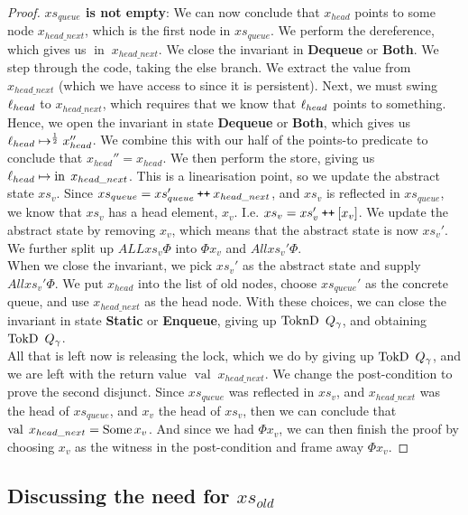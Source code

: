 \documentclass[a4paper, 11pt]{report}
\newcommand{\nIn}[1]{\operatorname{in} \; #1}
\newcommand{\nVal}[1]{\operatorname{val} \; #1}
\newcommand{\StaticState}{\textbf{Static}}
\newcommand{\EnqueueState}{\textbf{Enqueue}}
\newcommand{\DequeueState}{\textbf{Dequeue}}
\newcommand{\BothState}{\textbf{Both}}
\newcommand{\Qg}{Q_\gname}
\newcommand{\TokD}[1]{\operatorname{TokD}\ #1}
\newcommand{\TokDQg}{\TokD{\Qg}}
\newcommand{\ToknD}[1]{\operatorname{ToknD}\ #1}
\newcommand{\ToknDQg}{\ToknD{\Qg}}
\newcommand\catenate{\mathbin{\text{\ttfamily\upshape ++}}}
\begin{document}
\begin{proof}
\textbf{$xs_{queue}$ is not empty}:
We can now conclude that $x_{head}$ points to some node $x_{head\_next}$, which is the first node in $xs_{queue}$. We perform the dereference, which gives us $\nIn{x_{head\_next}}$. We close the invariant in \DequeueState{} or \BothState{}. We step through the code, taking the else branch. We extract the value from $x_{head\_next}$ (which we have access to since it is persistent). Next, we must swing $\ell_{head}$ to $x_{head\_next}$, which requires that we know that $\ell_{head}$ points to something. Hence, we open the invariant in state \DequeueState{} or \BothState{}, which gives us $\ell_{head} \mapsto^{\frac{1}{2}} x_{head}''$. We combine this with our half of the points-to predicate to conclude that $x_{head}'' = x_{head}$. We then perform the store, giving us $\loc_{head} \mapsto \nIn{x_{head\_next}}$. This is a linearisation point, so we update the abstract state $xs_v$. Since $xs_{queue} = xs_{queue}' \catenate x_{head\_next}$, and $xs_v$ is reflected in $xs_{queue}$, we know that $xs_v$ has a head element, $x_v$. I.e. $xs_v = xs_v' \catenate [x_v]$. We update the abstract state by removing $x_v$, which means that the abstract state is now $xs_v'$. We further split up $ALL xs_v \Phi$ into $\Phi x_v$ and $All xs_v' \Phi$.\\
When we close the invariant, we pick $xs_v'$ as the abstract state and supply $All xs_v' \Phi$. We put $x_{head}$ into the list of old nodes, choose $xs_{queue}'$ as the concrete queue, and use $x_{head\_next}$ as the head node. With these choices, we can close the invariant in state \StaticState{} or \EnqueueState{}, giving up $\ToknDQg$, and obtaining $\TokDQg$.\\
All that is left now is releasing the lock, which we do by giving up $\TokDQg$, and we are left with the return value $\nVal{x_{head\_next}}$. We change the post-condition to prove the second disjunct. Since $xs_{queue}$ was reflected in $xs_v$, and $x_{head\_next}$ was the head of $xs_{queue}$, and $x_v$ the head of $xs_v$, then we can conclude that $\nVal{x_{head\_next}} = \Some x_v$. And since we had $\Phi x_v$, we can then finish the proof by choosing $x_v$ as the witness in the post-condition and frame away $\Phi x_v$.
\end{proof}

\subsection[Discussing need for xs\_old]{Discussing the need for $xs_{old}$}\label{TLMSQ:Discussion:xs_old}
\end{document}
